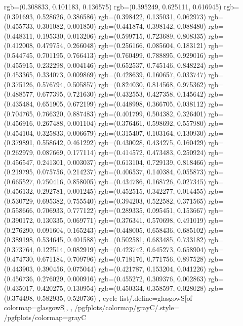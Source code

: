 {{{					rgb=(0.308833, 0.101183, 0.136575)
					rgb=(0.395249, 0.625111, 0.616945)
					rgb=(0.391693, 0.528626, 0.386586)
					rgb=(0.398422, 0.135031, 0.062973)
					rgb=(0.455733, 0.301082, 0.001850)
					rgb=(0.441874, 0.398142, 0.088480)
					rgb=(0.448311, 0.195330, 0.013206)
					rgb=(0.599715, 0.723689, 0.808335)
					rgb=(0.412008, 0.479754, 0.266048)
					rgb=(0.256166, 0.085604, 0.183121)
					rgb=(0.544745, 0.701195, 0.766413)
					rgb=(0.760499, 0.788895, 0.929016)
					rgb=(0.455915, 0.232298, 0.004146)
					rgb=(0.652537, 0.745146, 0.848224)
					rgb=(0.453365, 0.334073, 0.009869)
					rgb=(0.428639, 0.160657, 0.033747)
					rgb=(0.375126, 0.576794, 0.505857)
					rgb=(0.824030, 0.814568, 0.975362)
					rgb=(0.488577, 0.677395, 0.721630)
					rgb=(0.432553, 0.427358, 0.145642)
					rgb=(0.435484, 0.651905, 0.672199)
					rgb=(0.448998, 0.366705, 0.038112)
					rgb=(0.704765, 0.766320, 0.887483)
					rgb=(0.401799, 0.504382, 0.326401)
					rgb=(0.456916, 0.267488, 0.001104)
					rgb=(0.376461, 0.598692, 0.557980)
					rgb=(0.454104, 0.325833, 0.006679)
					rgb=(0.315407, 0.103164, 0.130930)
					rgb=(0.379891, 0.558642, 0.461292)
					rgb=(0.430028, 0.434275, 0.160429)
					rgb=(0.262979, 0.087669, 0.177114)
					rgb=(0.414572, 0.473483, 0.250924)
					rgb=(0.456547, 0.241301, 0.003037)
					rgb=(0.613104, 0.729139, 0.818466)
					rgb=(0.219795, 0.075756, 0.214237)
					rgb=(0.406537, 0.140384, 0.055873)
					rgb=(0.665527, 0.750416, 0.858005)
					rgb=(0.434786, 0.168726, 0.027345)
					rgb=(0.456132, 0.292781, 0.001245)
					rgb=(0.452515, 0.342277, 0.014455)
					rgb=(0.530729, 0.695382, 0.755540)
					rgb=(0.394203, 0.522582, 0.371565)
					rgb=(0.558666, 0.706933, 0.777122)
					rgb=(0.289335, 0.095451, 0.153667)
					rgb=(0.390172, 0.130335, 0.069771)
					rgb=(0.376341, 0.570698, 0.491019)
					rgb=(0.276290, 0.091604, 0.165243)
					rgb=(0.448005, 0.658436, 0.685102)
					rgb=(0.389198, 0.534645, 0.401588)
					rgb=(0.502581, 0.683485, 0.733182)
					rgb=(0.373764, 0.122514, 0.082919)
					rgb=(0.423742, 0.645273, 0.658904)
					rgb=(0.474730, 0.671184, 0.709796)
					rgb=(0.718176, 0.771756, 0.897528)
					rgb=(0.443903, 0.390456, 0.075044)
					rgb=(0.421787, 0.153204, 0.041226)
					rgb=(0.456736, 0.276029, 0.000916)
					rgb=(0.455272, 0.309376, 0.002863)
					rgb=(0.435017, 0.420275, 0.130954)
					rgb=(0.450334, 0.358597, 0.028028)
					rgb=(0.374498, 0.582935, 0.520736)
			},
		cycle list/.define={glasgowS}{[of colormap=glasgowS]},
		},
		/pgfplots/colormap/grayC/.style={
			/pgfplots/colormap={grayC}{%
}}}
